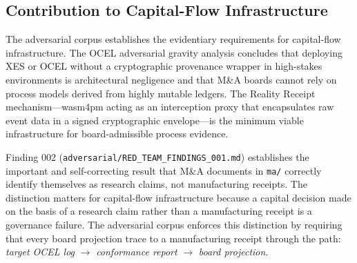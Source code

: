 \subsection{Contribution to Capital-Flow Infrastructure}
\label{sec:adversarial-contribution-capital}

The adversarial corpus establishes the evidentiary requirements for capital-flow
infrastructure. The OCEL adversarial gravity analysis concludes that deploying XES or OCEL
without a cryptographic provenance wrapper in high-stakes environments is architectural
negligence and that M\&A boards cannot rely on process models derived from highly mutable
ledgers. The Reality Receipt mechanism---wasm4pm acting as an interception proxy that
encapsulates raw event data in a signed cryptographic envelope---is the minimum viable
infrastructure for board-admissible process evidence.

Finding 002 (\texttt{adversarial/RED\_TEAM\_FINDINGS\_001.md}) establishes the important
and self-correcting result that M\&A documents in \texttt{ma/} correctly identify themselves
as research claims, not manufacturing receipts. The distinction matters for capital-flow
infrastructure because a capital decision made on the basis of a research claim rather than a
manufacturing receipt is a governance failure. The adversarial corpus enforces this
distinction by requiring that every board projection trace to a manufacturing receipt through
the path: \emph{target OCEL log} $\rightarrow$ \emph{conformance report} $\rightarrow$
\emph{board projection}.
